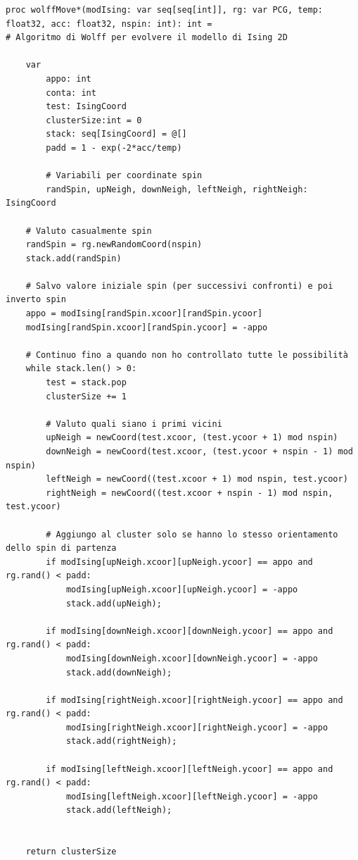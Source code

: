 \begin{verbatim}
proc wolffMove*(modIsing: var seq[seq[int]], rg: var PCG, temp: float32, acc: float32, nspin: int): int = 
# Algoritmo di Wolff per evolvere il modello di Ising 2D

    var 
        appo: int
        conta: int
        test: IsingCoord
        clusterSize:int = 0
        stack: seq[IsingCoord] = @[]
        padd = 1 - exp(-2*acc/temp)

        # Variabili per coordinate spin
        randSpin, upNeigh, downNeigh, leftNeigh, rightNeigh: IsingCoord

    # Valuto casualmente spin
    randSpin = rg.newRandomCoord(nspin)
    stack.add(randSpin)

    # Salvo valore iniziale spin (per successivi confronti) e poi inverto spin
    appo = modIsing[randSpin.xcoor][randSpin.ycoor]
    modIsing[randSpin.xcoor][randSpin.ycoor] = -appo

    # Continuo fino a quando non ho controllato tutte le possibilità
    while stack.len() > 0:
        test = stack.pop
        clusterSize += 1

        # Valuto quali siano i primi vicini
        upNeigh = newCoord(test.xcoor, (test.ycoor + 1) mod nspin)
        downNeigh = newCoord(test.xcoor, (test.ycoor + nspin - 1) mod nspin)
        leftNeigh = newCoord((test.xcoor + 1) mod nspin, test.ycoor)
        rightNeigh = newCoord((test.xcoor + nspin - 1) mod nspin, test.ycoor)

        # Aggiungo al cluster solo se hanno lo stesso orientamento dello spin di partenza
        if modIsing[upNeigh.xcoor][upNeigh.ycoor] == appo and rg.rand() < padd:
            modIsing[upNeigh.xcoor][upNeigh.ycoor] = -appo
            stack.add(upNeigh);

        if modIsing[downNeigh.xcoor][downNeigh.ycoor] == appo and rg.rand() < padd:
            modIsing[downNeigh.xcoor][downNeigh.ycoor] = -appo
            stack.add(downNeigh);

        if modIsing[rightNeigh.xcoor][rightNeigh.ycoor] == appo and rg.rand() < padd:
            modIsing[rightNeigh.xcoor][rightNeigh.ycoor] = -appo
            stack.add(rightNeigh);

        if modIsing[leftNeigh.xcoor][leftNeigh.ycoor] == appo and rg.rand() < padd:
            modIsing[leftNeigh.xcoor][leftNeigh.ycoor] = -appo
            stack.add(leftNeigh);
            
    
    return clusterSize

\end{verbatim}    
    